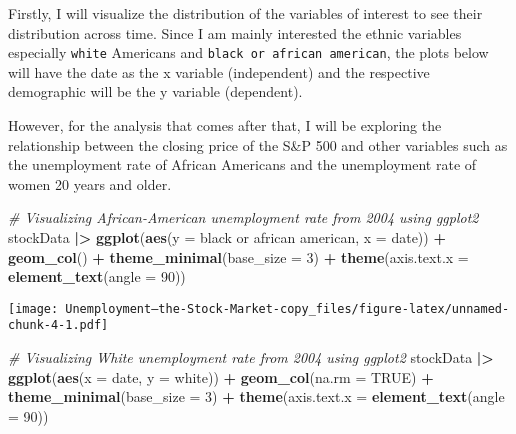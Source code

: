 \documentclass[
]{article}
\newenvironment{Shaded}{\begin{snugshade}}{\end{snugshade}}
\newcommand{\AttributeTok}[1]{\textcolor[rgb]{0.13,0.29,0.53}{#1}}
\newcommand{\CommentTok}[1]{\textcolor[rgb]{0.56,0.35,0.01}{\textit{#1}}}
\newcommand{\ConstantTok}[1]{\textcolor[rgb]{0.56,0.35,0.01}{#1}}
\newcommand{\DecValTok}[1]{\textcolor[rgb]{0.00,0.00,0.81}{#1}}
\newcommand{\FunctionTok}[1]{\textcolor[rgb]{0.13,0.29,0.53}{\textbf{#1}}}
\newcommand{\NormalTok}[1]{#1}
\newcommand{\SpecialCharTok}[1]{\textcolor[rgb]{0.81,0.36,0.00}{\textbf{#1}}}
\newcommand{\StringTok}[1]{\textcolor[rgb]{0.31,0.60,0.02}{#1}}
\begin{document}
Firstly, I will visualize the distribution of the variables of interest
to see their distribution across time. Since I am mainly interested the
ethnic variables especially \texttt{white} Americans and
\texttt{black\ or\ african\ american}, the plots below will have the
date as the x variable (independent) and the respective demographic will
be the y variable (dependent).

However, for the analysis that comes after that, I will be exploring the
relationship between the closing price of the S\&P 500 and other
variables such as the unemployment rate of African Americans and the
unemployment rate of women 20 years and older.

\begin{Shaded}
\begin{Highlighting}[]
\CommentTok{\# Visualizing African{-}American unemployment rate from 2004 using ggplot2}
\NormalTok{stockData }\SpecialCharTok{|\textgreater{}}
  \FunctionTok{ggplot}\NormalTok{(}\FunctionTok{aes}\NormalTok{(}\AttributeTok{y =} \StringTok{\textasciigrave{}}\AttributeTok{black or african american}\StringTok{\textasciigrave{}}\NormalTok{, }\AttributeTok{x =}\NormalTok{ date)) }\SpecialCharTok{+}
  \FunctionTok{geom\_col}\NormalTok{() }\SpecialCharTok{+} 
  \FunctionTok{theme\_minimal}\NormalTok{(}\AttributeTok{base\_size =} \DecValTok{3}\NormalTok{) }\SpecialCharTok{+}
  \FunctionTok{theme}\NormalTok{(}\AttributeTok{axis.text.x =} \FunctionTok{element\_text}\NormalTok{(}\AttributeTok{angle =} \DecValTok{90}\NormalTok{))}
\end{Highlighting}
\end{Shaded}

\texttt{[image: Unemployment---the-Stock-Market-copy\_files/figure-latex/unnamed-chunk-4-1.pdf]}

\begin{Shaded}
\begin{Highlighting}[]
\CommentTok{\# Visualizing White unemployment rate from 2004 using ggplot2}
\NormalTok{stockData }\SpecialCharTok{|\textgreater{}} 
  \FunctionTok{ggplot}\NormalTok{(}\FunctionTok{aes}\NormalTok{(}\AttributeTok{x =}\NormalTok{ date, }\AttributeTok{y =}\NormalTok{ white)) }\SpecialCharTok{+}
  \FunctionTok{geom\_col}\NormalTok{(}\AttributeTok{na.rm =} \ConstantTok{TRUE}\NormalTok{) }\SpecialCharTok{+} 
  \FunctionTok{theme\_minimal}\NormalTok{(}\AttributeTok{base\_size =} \DecValTok{3}\NormalTok{) }\SpecialCharTok{+}
  \FunctionTok{theme}\NormalTok{(}\AttributeTok{axis.text.x =} \FunctionTok{element\_text}\NormalTok{(}\AttributeTok{angle =} \DecValTok{90}\NormalTok{))}
\end{Highlighting}
\end{Shaded}
\end{document}
